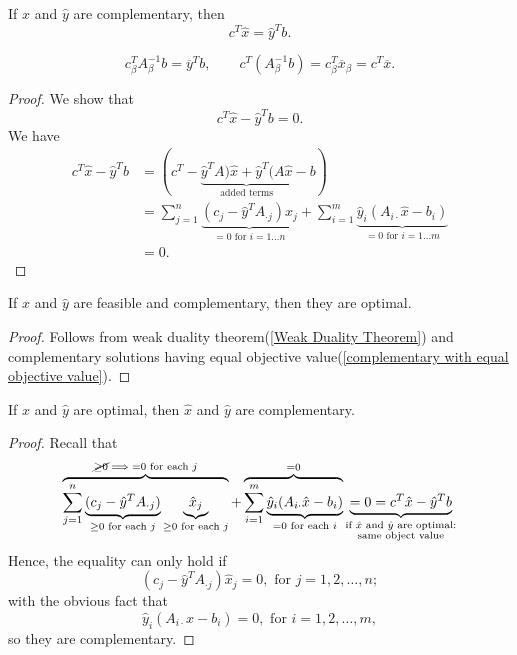 \begin{theorem}\label{complementary with equal objective value}
	If \(\hat{x}\) and \(\hat{y}\) are complementary, then
	\[
		c^{T}\hat{x} = \hat{y}^{T} b.
	\]
\end{theorem}
\begin{note}
	\[
		c^{T}_{\beta} A^{-1}_{\beta}b = \overline{y}^{T} b,\qquad c^{T}(A^{-1}_{\beta} b) = c^{T}_{\beta}\overline{x}_{\beta} = c^{T}\overline{x}.
	\]
\end{note}
\begin{proof}
	We show that
	\[
		c^{T} \hat{x} - \hat{y}^{T} b = 0.
	\]
	We have
	\[
		\begin{split}
			c^{T} \hat{x} - \hat{y}^{T} b &= (c^{T} - \underbrace{\hat{y}^{T}A)\hat{x} + \hat{y}^{T}(A \hat{x}}_{\text{added terms}} - b)\\
			&=\sum\limits_{j=1}^{n} \underbrace{(c_{j}-\hat{y}^{T}A_{\cdot j})x_{j}}_{ = 0\text{ for }i = 1\ldots n}
			+ \sum\limits_{i=1}^{m} \underbrace{\hat{y}_i(A_{i\cdot}\hat{x} - b_{i})}_{ = 0\text{ for }i = 1\ldots m}\\
			&= 0.
		\end{split}
	\]
\end{proof}

\begin{theorem}\label{Weak Complementary Slackness}
	If \(\hat{x}\) and \(\hat{y}\) are feasible and complementary, then they are optimal.
\end{theorem}
\begin{proof}
	Follows from weak duality theorem(\autoref{Weak Duality Theorem}) and complementary solutions having equal objective value(\autoref{complementary with equal objective value}).
\end{proof}

\begin{theorem}\label{Strong Complementary Slackness}
	If \(\hat{x}\) and \(\hat{y}\) are optimal, then \(\hat{x}\) and \(\hat{y}\) are complementary.
\end{theorem}
\begin{proof}
	Recall that
	\[
		\overbrace{\sum\limits_{j=1}^{n} \underbrace{(c_{j}-\hat{y}^{T}A_{\cdot j})}_{ \geq 0\text{ for each }j}\underbrace{\hat{x}_{j}}_{\geq 0 \text{ for each }j}}^{\cancel{\geq 0}\implies = 0\text{ for each }j}
		+ \overbrace{\sum\limits_{i=1}^{m} \underbrace{\hat{y}_i(A_{i\cdot}\hat{x} - b_{i})}_{ = 0\text{ for each }i}}^{=0}
		\underbrace{= 0 = c^{T}\hat{x} - \hat{y}^{T}b}_{\substack{\text{if }\hat{x}\text{ and }\hat{y}\text{ are optimal:}\\ \text{same object value}}}
	\]
	Hence, the equality can only hold if
	\[
		(c_{j} - \hat{y}^{T}A_{\cdot j})\hat{x}_j = 0, \text{ for }j = 1, 2, \ldots , n;
	\]
	with the obvious fact that
	\[
		\hat{y}_i(A_{i\cdot}\hat{x} - b_{i}) = 0, \text{ for }i = 1, 2, \ldots , m,
	\]
	so they are complementary.
\end{proof}

